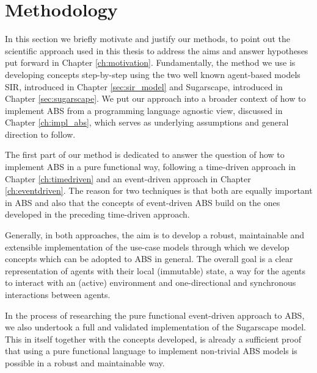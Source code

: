\chapter{Methodology}
\label{ch:methodology}


In this section we briefly motivate and justify our methods, to point out the scientific approach used in this thesis to address the aims and answer hypotheses put forward in Chapter \ref{ch:motivation}. Fundamentally, the method we use is developing concepts step-by-step using the two well known agent-based models SIR, introduced in Chapter \ref{sec:sir_model} and Sugarscape, introduced in Chapter \ref{sec:sugarscape}. We put our approach into a broader context of how to implement ABS from a programming language agnostic view, discussed in Chapter \ref{ch:impl_abs}, which serves as underlying assumptions and general direction to follow.

The first part of our method is dedicated to answer the question of how to implement ABS in a pure functional way, following a time-driven approach in Chapter \ref{ch:timedriven} and an event-driven approach in Chapter \ref{ch:eventdriven}. The reason for two techniques is that both are equally important in ABS and also that the concepts of event-driven ABS build on the ones developed in the preceding time-driven approach.

Generally, in both approaches, the aim is to develop a robust, maintainable and extensible implementation of the use-case models through which we develop concepts which can be adopted to ABS in general. The overall goal is a clear representation of agents with their local (immutable) state, a way for the agents to interact with an (active) environment and one-directional and synchronous interactions between agents. 

In the process of researching the pure functional event-driven approach to ABS, we also undertook a full and validated implementation of the Sugarscape model. This in itself together with the concepts developed, is already a sufficient proof that using a pure functional language to implement non-trivial ABS models is possible in a robust and maintainable way.

